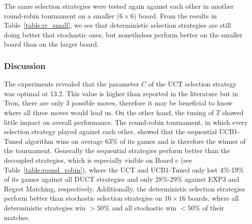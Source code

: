 \documentclass{article}
\begin{document}
The same selection strategies were tested again against each other in another round-robin tournament on a smaller ($6 \times 6$) board. 
From the results in Table~\ref{table:rr_small}, we see that deterministic selection strategies are still doing better that stochastic 
ones, but nonetheless perform better on the smaller board than on the larger board.

\subsubsection{Discussion}
\label{subsec:discussion}



The experiments revealed that the parameter $C$ of the UCT selection strategy was optimal at 13.2. 
This value is higher than reported in the literature but in Tron, there are only 3 possible moves, therefore it may be beneficial to know where all three moves would lead us. 
On the other hand, the tuning of $T$ showed little impact on overall performance. 
The round-robin tournament, in which every selection strategy played against each other, showed that the sequential UCB1-Tuned algorithm wins on average 63\% of its games and is therefore the winner of the tournament. 
Generally the sequential strategies perform better than the decoupled strategies, which is especially visible on Board c (see Table~\ref{table:round_robin}), where the UCT and UCB1-Tuned only lost 4\%-19\% of its games against all DUCT strategies and only 28\%-29\% against EXP3 and Regret Matching, respectively. 
Additionally, the deterministic selection strategies perform better than stochastic selection strategies on $16\times16$ boards, where all deterministic strategies win $>50\%$ and all stochastic win $<50\%$ of their matches. 
\end{document}
